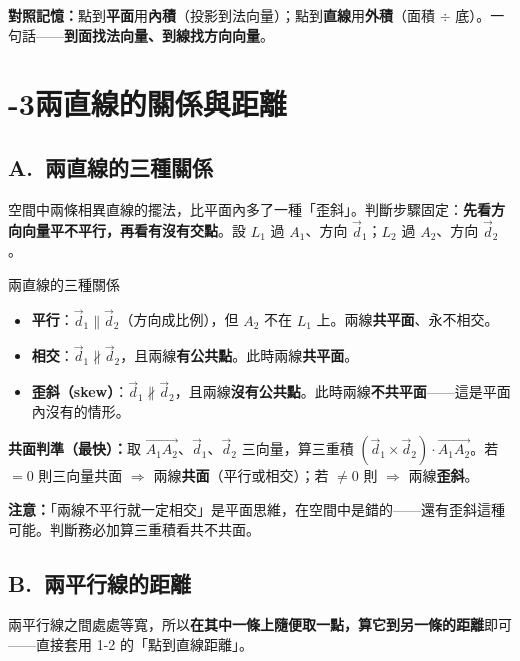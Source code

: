 \documentclass[11pt]{article}
\begin{document}
\textbf{對照記憶：}點到\textbf{平面}用\textbf{內積}（投影到法向量）；點到\textbf{直線}用\textbf{外積}（面積 $\div$ 底）。一句話——\textbf{到面找法向量、到線找方向向量}。

\section*{-3\quad 兩直線的關係與距離}

\subsection*{\sffamily A.\ 兩直線的三種關係}

空間中兩條相異直線的擺法，比平面內多了一種「歪斜」。判斷步驟固定：\textbf{先看方向向量平不平行，再看有沒有交點}。設 $L_1$ 過 $A_1$、方向 $\vec d_1$；$L_2$ 過 $A_2$、方向 $\vec d_2$。


\begin{補充框}{兩直線的三種關係}
\begin{itemize}\setlength{\itemsep}{2pt}
\item \textbf{平行}：$\vec d_1\parallel\vec d_2$（方向成比例），但 $A_2$ 不在 $L_1$ 上。兩線\textbf{共平面}、永不相交。
\item \textbf{相交}：$\vec d_1\not\parallel\vec d_2$，且兩線\textbf{有公共點}。此時兩線\textbf{共平面}。
\item \textbf{歪斜（skew）}：$\vec d_1\not\parallel\vec d_2$，且兩線\textbf{沒有公共點}。此時兩線\textbf{不共平面}——這是平面內沒有的情形。
\end{itemize}
\textbf{共面判準（最快）：}取 $\vec{A_1A_2}$、$\vec d_1$、$\vec d_2$ 三向量，算三重積 $(\vec d_1\times\vec d_2)\cdot\vec{A_1A_2}$。若 $=0$ 則三向量共面 $\Rightarrow$ 兩線\textbf{共面}（平行或相交）；若 $\ne0$ 則 $\Rightarrow$ 兩線\textbf{歪斜}。
\end{補充框}

\textbf{注意：}「兩線不平行就一定相交」是平面思維，在空間中是錯的——還有歪斜這種可能。判斷務必加算三重積看共不共面。

\subsection*{\sffamily B.\ 兩平行線的距離}

兩平行線之間處處等寬，所以\textbf{在其中一條上隨便取一點，算它到另一條的距離}即可——直接套用 1-2 的「點到直線距離」。
\end{document}
